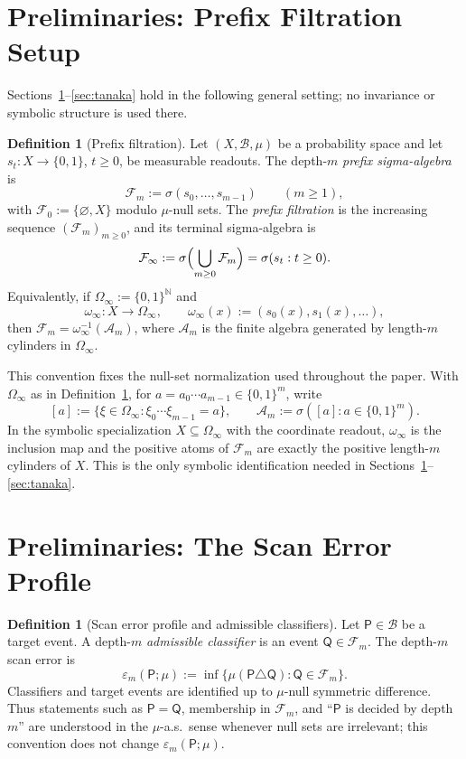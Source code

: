 \documentclass{etds}%
\numberwithin{equation}{section}
\theoremstyle{plain}
\theoremstyle{definition}
\newtheorem{definition}[theorem]{Definition}
\theoremstyle{remark}
\newcommand{\NN}{\mathbb{N}}
\begin{document}
\section{Preliminaries: Prefix Filtration Setup}
\label{sec:prefix}

Sections~\ref{sec:prefix}--\ref{sec:tanaka} hold in the following general
setting; no invariance or symbolic structure is used there.

\begin{definition}[Prefix filtration]
\label{def:prefix-filtration}
Let $(X,\mathcal{B},\mu)$ be a probability space and let
$s_t:X\to\{0,1\}$, $t\ge 0$, be measurable readouts.  The depth-$m$
\emph{prefix sigma-algebra} is
\[
\mathcal{F}_m:=\sigma(s_0,\ldots,s_{m-1})
\qquad(m\ge 1),
\]
with $\mathcal{F}_0:=\{\varnothing,X\}$ modulo $\mu$-null sets.  The
\emph{prefix filtration} is the increasing sequence
$(\mathcal{F}_m)_{m\ge 0}$, and its terminal sigma-algebra is
\[
\mathcal{F}_\infty:=\sigma\Bigl(\bigcup_{m\ge 0}\mathcal{F}_m\Bigr)
=\sigma(s_t:t\ge 0).
\]
Equivalently, if $\Omega_\infty:=\{0,1\}^{\NN}$ and
\[
\omega_\infty:X\to\Omega_\infty,\qquad
\omega_\infty(x):=(s_0(x),s_1(x),\ldots),
\]
then $\mathcal{F}_m=\omega_\infty^{-1}(\mathcal{A}_m)$, where
$\mathcal{A}_m$ is the finite algebra generated by length-$m$ cylinders in
$\Omega_\infty$.
\end{definition}

This convention fixes the null-set normalization used throughout the paper.  With
$\Omega_\infty$ as in Definition~\ref{def:prefix-filtration}, for
$a=a_0\cdots a_{m-1}\in\{0,1\}^m$, write
\[
[a]:=\{\xi\in\Omega_\infty:\xi_0\cdots\xi_{m-1}=a\},
\qquad
\mathcal{A}_m:=\sigma([a]:a\in\{0,1\}^m).
\]
In the symbolic specialization $X\subseteq\Omega_\infty$ with the coordinate
readout, $\omega_\infty$ is the inclusion map and the positive atoms of
$\mathcal{F}_m$ are exactly the positive length-$m$ cylinders of $X$.  This is
the only symbolic identification needed in Sections~\ref{sec:prefix}--\ref{sec:tanaka}.

\section{Preliminaries: The Scan Error Profile}
\label{sec:scan}

\begin{definition}[Scan error profile and admissible classifiers]
\label{def:scan-error-profile}
Let $\mathsf{P}\in\mathcal{B}$ be a target event.  A depth-$m$
\emph{admissible classifier} is an event $\mathsf{Q}\in\mathcal{F}_m$.
The depth-$m$ scan error is
\[
\varepsilon_m(\mathsf{P};\mu)
:=\inf\{\mu(\mathsf{P}\triangle\mathsf{Q}):\mathsf{Q}\in\mathcal{F}_m\}.
\]
Classifiers and target events are identified up to $\mu$-null symmetric
difference.  Thus statements such as $\mathsf{P}=\mathsf{Q}$, membership in
$\mathcal{F}_m$, and ``$\mathsf{P}$ is decided by depth $m$'' are understood
in the $\mu$-a.s.\ sense whenever null sets are irrelevant; this convention
does not change $\varepsilon_m(\mathsf{P};\mu)$.
\end{definition}
\end{document}
